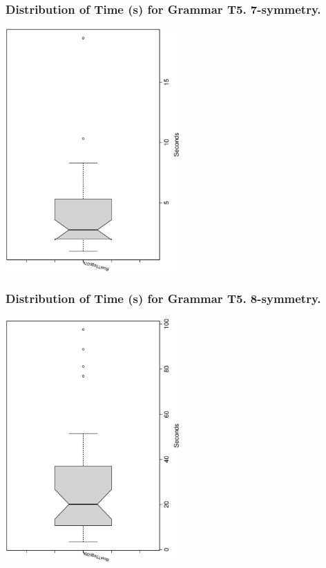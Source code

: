 \documentclass[18pt,c]{beamer}
\begin{document}
 \begin{frame}
 \frametitle{ Distribution of Time (s) for Grammar T5. 7-symmetry. }
 \begin{center}
\includegraphics[width=0.5\textwidth, angle=-90]
{ExpFboxplottSeconds005.eps}
 \end{center}
 \label{ExpFboxplottSeconds005.eps}  
 \end{frame}

 \begin{frame}
 \frametitle{ Distribution of Time (s) for Grammar T5. 8-symmetry. }
 \begin{center}
\includegraphics[width=0.5\textwidth, angle=-90]
{ExpFboxplottSeconds006.eps}
 \end{center}
 \label{ExpFboxplottSeconds006.eps}  
 \end{frame}
\end{document}

